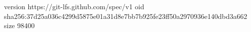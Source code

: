 version https://git-lfs.github.com/spec/v1
oid sha256:37d25a036c4299d5875e01a31d8e7bb7b925fe23ff50a2970936e140dbd3a662
size 98400

